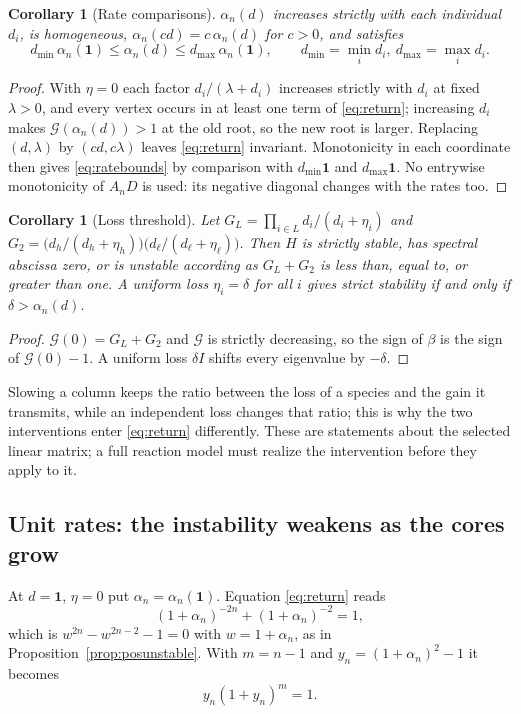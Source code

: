 \documentclass[11pt,a4paper]{article}
\theoremstyle{plain}
\newtheorem{corollary}[theorem]{Corollary}
\theoremstyle{definition}
\theoremstyle{remark}
\newcommand{\cG}{\mathcal G}
\begin{document}
\begin{corollary}[Rate comparisons]\label{cor:rates}
$\alpha_n(d)$ increases strictly with each individual $d_i$, is homogeneous, $\alpha_n(cd)=c\,\alpha_n(d)$ for $c>0$, and satisfies
\begin{equation}\label{eq:ratebounds}
d_{\min}\,\alpha_n(\mathbf 1)\le\alpha_n(d)\le d_{\max}\,\alpha_n(\mathbf 1),\qquad d_{\min}=\min_id_i,\ d_{\max}=\max_id_i .
\end{equation}
\end{corollary}
\begin{proof}
With $\eta=0$ each factor $d_i/(\lambda+d_i)$ increases strictly with $d_i$ at fixed $\lambda>0$, and every vertex occurs in at least one term of \eqref{eq:return}; increasing $d_i$ makes $\cG(\alpha_n(d))>1$ at the old root, so the new root is larger. Replacing $(d,\lambda)$ by $(cd,c\lambda)$ leaves \eqref{eq:return} invariant. Monotonicity in each coordinate then gives \eqref{eq:ratebounds} by comparison with $d_{\min}\mathbf1$ and $d_{\max}\mathbf1$. No entrywise monotonicity of $A_nD$ is used: its negative diagonal changes with the rates too.
\end{proof}

\begin{corollary}[Loss threshold]\label{cor:loss}
Let $G_L=\prod_{i\in L}d_i/(d_i+\eta_i)$ and $G_2=\bigl(d_h/(d_h+\eta_h)\bigr)\bigl(d_\ell/(d_\ell+\eta_\ell)\bigr)$. Then $H$ is strictly stable, has spectral abscissa zero, or is unstable according as $G_L+G_2$ is less than, equal to, or greater than one. A uniform loss $\eta_i=\delta$ for all $i$ gives strict stability if and only if $\delta>\alpha_n(d)$.
\end{corollary}
\begin{proof}
$\cG(0)=G_L+G_2$ and $\cG$ is strictly decreasing, so the sign of $\beta$ is the sign of $\cG(0)-1$. A uniform loss $\delta I$ shifts every eigenvalue by $-\delta$.
\end{proof}

Slowing a column keeps the ratio between the loss of a species and the gain it transmits, while an independent loss changes that ratio; this is why the two interventions enter \eqref{eq:return} differently. These are statements about the selected linear matrix; a full reaction model must realize the intervention before they apply to it.

\subsection{Unit rates: the instability weakens as the cores grow}
At $d=\mathbf1$, $\eta=0$ put $\alpha_n=\alpha_n(\mathbf1)$. Equation \eqref{eq:return} reads
\begin{equation}\label{eq:unitreturn}
(1+\alpha_n)^{-2n}+(1+\alpha_n)^{-2}=1,
\end{equation}
which is $w^{2n}-w^{2n-2}-1=0$ with $w=1+\alpha_n$, as in Proposition~\ref{prop:posunstable}. With $m=n-1$ and $y_n=(1+\alpha_n)^2-1$ it becomes
\begin{equation}\label{eq:y}
y_n(1+y_n)^m=1 .
\end{equation}
\end{document}

